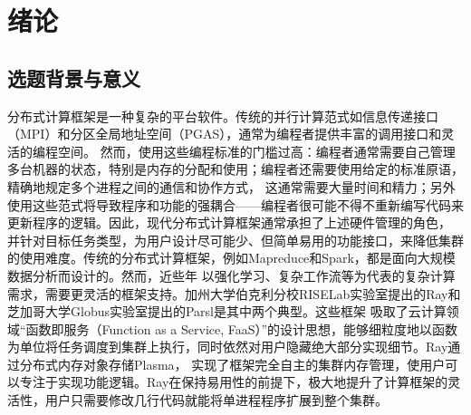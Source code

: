 
\chapter{绪论}
\label{cha:introduction}
\section{选题背景与意义}
\label{sec:background}

分布式计算框架是一种复杂的平台软件。传统的并行计算范式如信息传递接口（MPI）和分区全局地址空间（PGAS），通常为编程者提供丰富的调用接口和灵活的编程空间。
然而，使用这些编程标准的门槛过高：编程者通常需要自己管理多台机器的状态，特别是内存的分配和使用；编程者还需要使用给定的标准原语，精确地规定多个进程之间的通信和协作方式，
这通常需要大量时间和精力；另外使用这些范式将导致程序和功能的强耦合——编程者很可能不得不重新编写代码来更新程序的逻辑。因此，现代分布式计算框架通常承担了上述硬件管理的角色，
并针对目标任务类型，为用户设计尽可能少、但简单易用的功能接口，来降低集群的使用难度。传统的分布式计算框架，例如Mapreduce和Spark，都是面向大规模数据分析而设计的。然而，近些年
以强化学习、复杂工作流等为代表的复杂计算需求，需要更灵活的框架支持。加州大学伯克利分校RISELab实验室提出的Ray和芝加哥大学Globus实验室提出的Parsl是其中两个典型。这些框架
吸取了云计算领域“函数即服务（Function as a Service, FaaS）”的设计思想，能够细粒度地以函数为单位将任务调度到集群上执行，同时依然对用户隐藏绝大部分实现细节。Ray通过分布式内存对象存储Plasma，
实现了框架完全自主的集群内存管理，使用户可以专注于实现功能逻辑。Ray在保持易用性的前提下，极大地提升了计算框架的灵活性，用户只需要修改几行代码就能将单进程程序扩展到整个集群。

